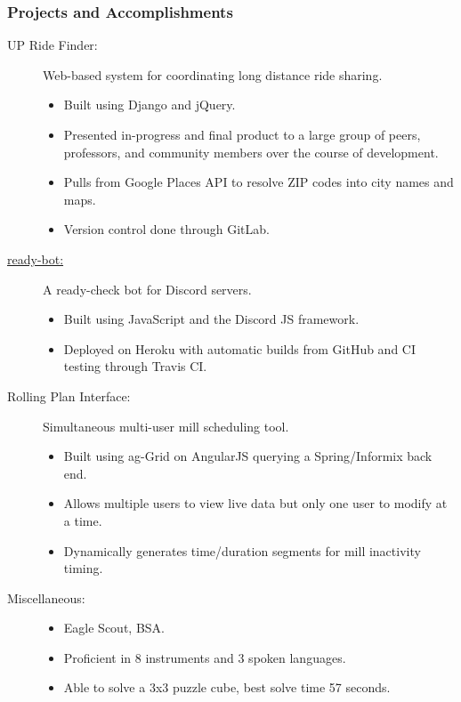 \documentclass{article}
\begin{document}
\subsubsection*{Projects and Accomplishments}
    \begin{description}
        \item[UP Ride Finder:] Web-based system for coordinating long distance ride sharing.
            \begin{itemize}
                \item Built using Django and jQuery.
                \item Presented in-progress and final product to a large group of peers, professors, and community members over the course of development.
                \item Pulls from Google Places API to resolve ZIP codes into city names and maps.
                \item Version control done through GitLab.
            \end{itemize}

            \vspace{0.5em}

        \item[\href{https://www.github.com/BurnsCommaLucas/Resume}{ready-bot:}] A ready-check bot for Discord servers.
            \begin{itemize}
                \item Built using JavaScript and the Discord JS framework.
                \item Deployed on Heroku with automatic builds from GitHub and CI testing through Travis CI.
            \end{itemize}

            \vspace{0.5em}

        \item[Rolling Plan Interface:] Simultaneous multi-user mill scheduling tool.
            \begin{itemize}
                \item Built using ag-Grid on AngularJS querying a Spring/Informix back end.
                \item Allows multiple users to view live data but only one user to modify at a time.
                \item Dynamically generates time/duration segments for mill inactivity timing.
            \end{itemize}

            \vspace{0.5em}

        \item[Miscellaneous:] \hfill
            \begin{itemize}
                \item Eagle Scout, BSA.
                \item Proficient in 8 instruments and 3 spoken languages.
                \item Able to solve a 3x3 puzzle cube, best solve time 57 seconds.
        \end{itemize}
    \end{description}
\end{document}
